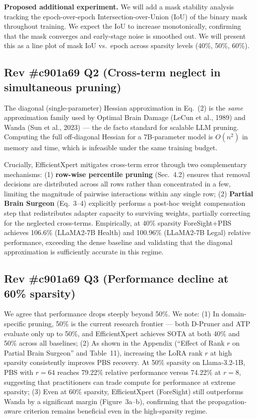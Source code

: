 \documentclass{article}
\begin{document}
\textbf{Proposed additional experiment.} We will add a mask stability analysis tracking the epoch-over-epoch Intersection-over-Union (IoU) of the binary mask throughout training. We expect the IoU to increase monotonically, confirming that the mask converges and early-stage noise is smoothed out. We will present this as a line plot of mask IoU vs.\ epoch across sparsity levels (40\%, 50\%, 60\%).

\subsection*{Rev \#c901a69 Q2 (Cross-term neglect in simultaneous pruning)}

The diagonal (single-parameter) Hessian approximation in Eq.~(2) is the \emph{same} approximation family used by Optimal Brain Damage (LeCun et al., 1989) and Wanda (Sun et al., 2023) --- the de facto standard for scalable LLM pruning. Computing the full off-diagonal Hessian for a 7B-parameter model is $O(n^2)$ in memory and time, which is infeasible under the same training budget.

Crucially, EfficientXpert mitigates cross-term error through two complementary mechanisms: (1) \textbf{row-wise percentile pruning} (Sec.~4.2) ensures that removal decisions are distributed across all rows rather than concentrated in a few, limiting the magnitude of pairwise interactions within any single row; (2) \textbf{Partial Brain Surgeon} (Eq.~3--4) explicitly performs a post-hoc weight compensation step that redistributes adapter capacity to surviving weights, partially correcting for the neglected cross-terms. Empirically, at 40\% sparsity ForeSight+PBS achieves 106.6\% (LLaMA2-7B Health) and 100.96\% (LLaMA2-7B Legal) relative performance, exceeding the dense baseline and validating that the diagonal approximation is sufficiently accurate in this regime.

\subsection*{Rev \#c901a69 Q3 (Performance decline at 60\% sparsity)}

We agree that performance drops steeply beyond 50\%. We note: (1) In domain-specific pruning, 50\% is the current research frontier --- both D-Pruner and ATP evaluate only up to 50\%, and EfficientXpert achieves SOTA at both 40\% and 50\% across all baselines; (2) As shown in the Appendix (``Effect of Rank $r$ on Partial Brain Surgeon'' and Table~11), increasing the LoRA rank $r$ at high sparsity consistently improves PBS recovery. At 50\% sparsity on Llama-3.2-1B, PBS with $r=64$ reaches 79.22\% relative performance versus 74.22\% at $r=8$, suggesting that practitioners can trade compute for performance at extreme sparsity; (3) Even at 60\% sparsity, EfficientXpert (ForeSight) still outperforms Wanda by a significant margin (Figure~3a--b), confirming that the propagation-aware criterion remains beneficial even in the high-sparsity regime.
\end{document}
